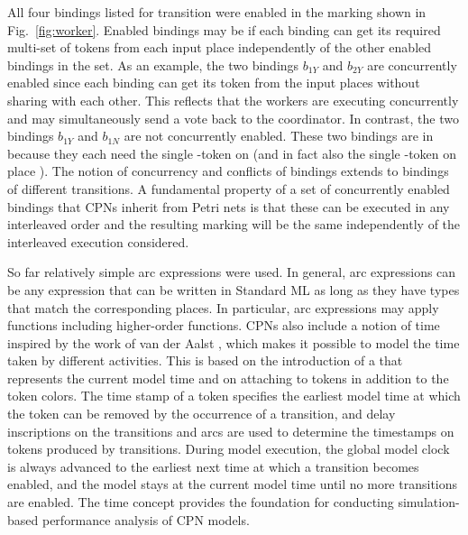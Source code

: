 All four bindings listed for transition 
were enabled in the marking shown in Fig.~\ref{fig:worker}. Enabled
bindings may be  if each binding can get
its required multi-set of tokens from each input place independently
of the other enabled bindings in the set. As an example, the two
bindings $b_{1Y}$ and $b_{2Y}$ are concurrently enabled since each
binding can get its token from the input places without sharing with
each other. This reflects that the workers are executing concurrently
and may simultaneously send a vote back to the coordinator. In
contrast, the two bindings $b_{1Y}$ and $b_{1N}$ are not concurrently
enabled. These two bindings are in  because they
each need the single -token on  (and in
fact also the single -token on place
). The notion of concurrency and conflicts of bindings
extends to bindings of different transitions. A fundamental property
of a set of concurrently enabled bindings that CPNs inherit from Petri
nets is that these can be executed in any interleaved order and the
resulting marking will be the same independently of the interleaved
execution considered.

 So far relatively simple arc expressions were used. In general, arc
 expressions can be any expression that can be written in Standard ML
 as long as they have types that match the corresponding places. In
 particular, arc expressions may apply functions including
 higher-order functions. CPNs also include a notion of time inspired
 by the work of van der Aalst \cite{aalst:93}, which makes it possible
 to model the time taken by different activities. This is based on the
 introduction of a  that represents the current
 model time and on attaching  to tokens in
 addition to the token colors. The time stamp of a token specifies the
 earliest model time at which the token can be removed by the
 occurrence of a transition, and delay inscriptions on the transitions
 and arcs are used to determine the timestamps on tokens produced by
 transitions. During model execution, the global model clock is always
 advanced to the earliest next time at which a transition becomes
 enabled, and the model stays at the current model time until no more
 transitions are enabled. The time concept provides the foundation for
 conducting simulation-based performance analysis of CPN models.



